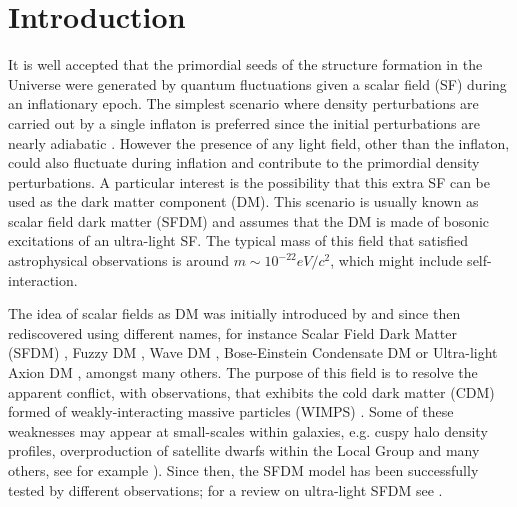 \documentclass[amssymb,twocolumn,prd,nofootinbib,showpacs]{revtex4-1}
\begin{document}
\maketitle


\section{Introduction}
\label{introduction}

It is well accepted that the primordial seeds of the structure formation in the Universe were generated by quantum 
fluctuations given a scalar field (SF) during an inflationary epoch. 
The simplest scenario where density perturbations are carried out by a single inflaton is preferred 
since the initial perturbations are nearly adiabatic \cite{const1,const2,planck}. 
However the presence of any light field, other than the inflaton, could also fluctuate during inflation and 
contribute to the primordial density perturbations. A particular interest is the possibility that this extra SF 
can be used as the dark matter component (DM). This scenario is usually known 
as scalar field dark matter (SFDM) and assumes that the DM is made of bosonic excitations of an ultra-light SF. 
The typical mass of this field that satisfied astrophysical observations is around 
$m\sim 10^{-22}eV/c^2$, which might include self-interaction.
%

The idea of scalar fields as DM was initially introduced by \cite{SF1} and since then rediscovered 
using different names, for instance Scalar Field Dark Matter  (SFDM)  \cite{SF2},  Fuzzy  DM  \cite{SF3}, 
Wave DM \cite{SF4,SF5}, Bose-Einstein Condensate DM \cite{SF6} or Ultra-light Axion DM \cite{SF7,SF8}, 
amongst many others. 
%
The purpose of this field is to resolve the apparent conflict, with observations, that exhibits the
cold dark matter (CDM) formed of weakly-interacting massive particles (WIMPS) \cite{LCDM1,LCDM2}. 
Some of these weaknesses may appear at small-scales within galaxies, e.g. cuspy halo density profiles, overproduction of 
satellite dwarfs within the Local Group and many others, see for example 
\cite{problem1,problem2,problem3,problem4,problem5}). 
Since then, the SFDM model has been successfully tested by different observations;  
for a review on ultra-light SFDM see \cite{SF9,SF10,SF11,SF12}. 
\end{document}
